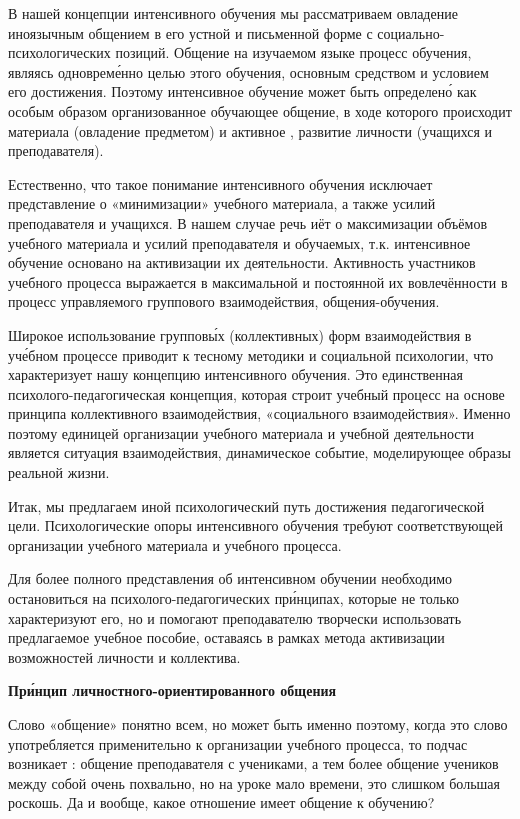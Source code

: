 В нашей концепции интенсивного обучения мы рассматриваем овладение иноязычным общением в его устной и письменной форме с социально-психологических позиций. Общение на изучаемом языке  процесс обучения, являясь одноврем\'{е}нно целью этого обучения, основным средством и условием его достижения. Поэтому интенсивное обучение может быть определен\'{о} как особым образом организованное обучающее общение, в ходе которого происходит   материала (овладение предметом) и активное , развитие личности (учащихся и преподавателя).

Естественно, что такое понимание интенсивного обучения исключает представление о «минимизации» учебного материала, а также усилий преподавателя и учащихся. В нашем случае речь иёт о максимизации объёмов учебного материала и усилий преподавателя и обучаемых, т.к. интенсивное обучение основано на активизации их деятельности. Активность участников учебного процесса выражается в максимальной и постоянной их вовлечённости в процесс управляемого группового взаимодействия, общения-обучения.

Широкое использование группов\'{ы}х (коллективных) форм взаимодействия в уч\'{е}бном процессе приводит к тесному  методики и социальной психологии, что характеризует нашу концепцию интенсивного обучения. Это единственная психолого-педагогическая концепция, которая строит учебный процесс на основе принципа коллективного взаимодействия, «социального взаимодействия». Именно поэтому единицей организации учебного материала и учебной деятельности является ситуация взаимодействия, динамическое событие, моделирующее образы реальной жизни.

Итак, мы предлагаем иной психологический путь достижения педагогической цели. Психологические опоры интенсивного обучения требуют соответствующей организации учебного материала и учебного процесса.

Для более полного представления об интенсивном обучении необходимо остановиться на психолого-педагогических пр\'{и}нципах, которые не только характеризуют его, но и помогают преподавателю творчески использовать предлагаемое учебное пособие, оставаясь в рамках метода активизации возможностей личности и коллектива.

\textbf{Пр\'{и}нцип личностного-ориентированного общения}

Слово «общение» понятно всем, но может быть именно поэтому, когда это слово употребляется применительно к организации учебного процесса, то подчас возникает : общение преподавателя с учениками, а тем более общение учеников между собой очень похвально, но на уроке мало времени, это слишком большая роскошь. Да и вообще, какое отношение имеет общение к обучению?

